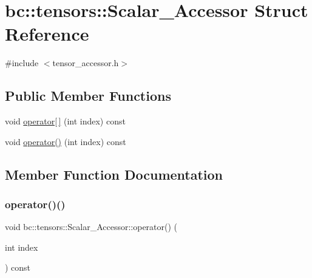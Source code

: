 \hypertarget{structbc_1_1tensors_1_1Scalar__Accessor}{}\section{bc\+:\+:tensors\+:\+:Scalar\+\_\+\+Accessor Struct Reference}
\label{structbc_1_1tensors_1_1Scalar__Accessor}


{\ttfamily \#include $<$tensor\+\_\+accessor.\+h$>$}

\subsection*{Public Member Functions}
\begin{DoxyCompactItemize}
\item 
void \hyperlink{structbc_1_1tensors_1_1Scalar__Accessor_a6da7a42ace5bae36c03fae5127c780cf}{operator\mbox{[}$\,$\mbox{]}} (int index) const
\item 
void \hyperlink{structbc_1_1tensors_1_1Scalar__Accessor_a45c8a6910231828bd87209fe175083a6}{operator()} (int index) const
\end{DoxyCompactItemize}


\subsection{Member Function Documentation}
\mbox{\label{structbc_1_1tensors_1_1Scalar__Accessor_a45c8a6910231828bd87209fe175083a6}} 
\subsubsection{\texorpdfstring{operator()()}{operator()()}}
{\footnotesize\ttfamily void bc\+::tensors\+::\+Scalar\+\_\+\+Accessor\+::operator() (\begin{DoxyParamCaption}\item[{int}]{index }\end{DoxyParamCaption}) const\hspace{0.3cm}{\ttfamily [inline]}}

\mbox{\label{structbc_1_1tensors_1_1Scalar__Accessor_a6da7a42ace5bae36c03fae5127c780cf}} 
